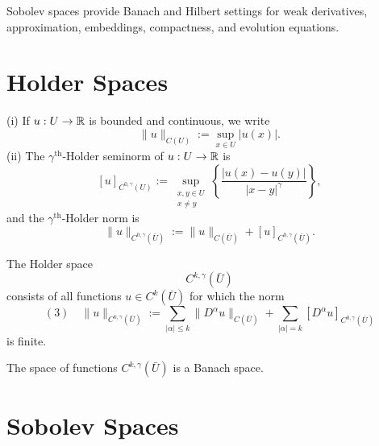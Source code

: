 
Sobolev spaces provide Banach and Hilbert settings for weak derivatives, approximation, embeddings, compactness, and evolution equations.

\section{Holder Spaces}
\label{sec:holder-spaces}

\begin{definition}
\label{def:holder-seminorm-sup-norm}
(i) If $u : U \to \mathbb{R}$ is bounded and continuous, we write
$$\|u\|_{C(U)} := \sup_{x \in U} |u(x)|.$$
(ii) The $\gamma^{\text{th}}$-Holder seminorm of $u : U \to \mathbb{R}$ is
$$[u]_{C^{0,\gamma}(U)} := \sup_{\substack{x,y \in U \\ x \ne y}} \left\{ \frac{|u(x) - u(y)|}{|x - y|^\gamma} \right\},$$
and the $\gamma^{\text{th}}$-Holder norm is
$$\|u\|_{C^{0,\gamma}(\bar U)} := \|u\|_{C(\bar U)} + [u]_{C^{0,\gamma}(\bar U)}.$$
\end{definition}

\begin{definition}
\label{def:holder-space}

The Holder space
$$C^{k,\gamma}(\bar U)$$
consists of all functions $u \in C^k(\bar U)$ for which the norm
$$(3) \quad \|u\|_{C^{k,\gamma}(\bar U)} := \sum_{|\alpha| \le k} \|D^\alpha u\|_{C(\bar U)} + \sum_{|\alpha| = k} [D^\alpha u]_{C^{0,\gamma}(\bar U)}$$
is finite.
\end{definition}

\begin{theorem}
\label{thm:holder-space-banach}

The space of functions $C^{k,\gamma}(\bar U)$ is a Banach space.
\end{theorem}

\section{Sobolev Spaces}
\label{sec:sobolev-spaces}

